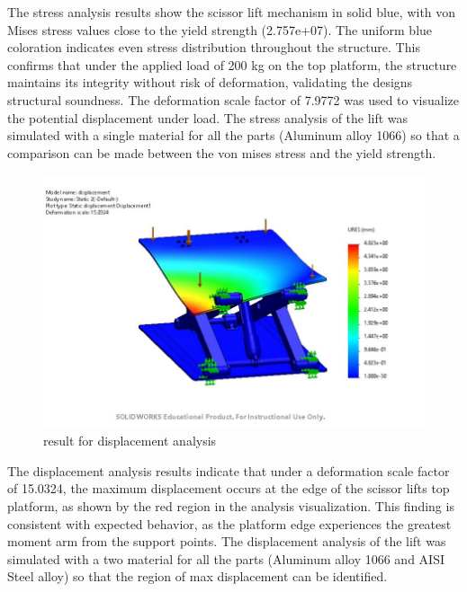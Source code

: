 \documentclass[../../main]{subfiles}
\begin{document}
The stress analysis results show the scissor lift mechanism in solid
blue, with von Mises stress values close to the yield strength
(2.757e+07). The uniform blue coloration indicates even stress
distribution throughout the structure. This confirms that under the
applied load of 200 kg on the top platform, the structure maintains its
integrity without risk of deformation, validating the
design\textquotesingle s structural soundness. The deformation scale
factor of 7.9772 was used to visualize the potential displacement under
load. The stress analysis of the lift was simulated with a single
material for all the parts (Aluminum alloy 1066) so that a comparison
can be made between the von mises stress and the yield strength.

\begin{figure}[h!]
  \centering
  \includegraphics[width=\textwidth]{img/image105.jpg}
  \caption{result for displacement analysis}
  \end{figure}
  

The displacement analysis results indicate that under a deformation
scale factor of 15.0324, the maximum displacement occurs at the edge of
the scissor lift\textquotesingle s top platform, as shown by the red
region in the analysis visualization. This finding is consistent with
expected behavior, as the platform edge experiences the greatest moment
arm from the support points. The displacement analysis of the lift was
simulated with a two material for all the parts (Aluminum alloy 1066 and
AISI Steel alloy) so that the region of max displacement can be
identified.
\end{document}
